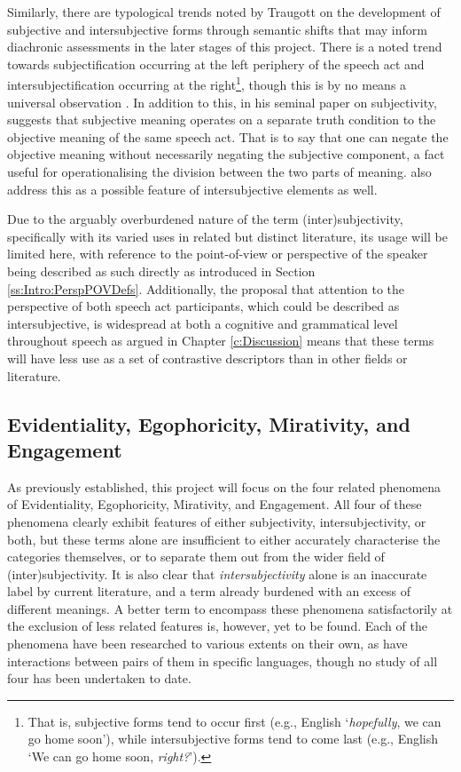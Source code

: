 Similarly, there are typological trends noted by Traugott on the development of subjective and intersubjective forms through semantic shifts that may inform diachronic assessments in the later stages of this project. There is a noted trend towards subjectification occurring at the left periphery of the speech act and intersubjectification occurring at the right\footnote{That is, subjective forms tend to occur first (e.g., English `\textit{hopefully}, we can go home soon'), while intersubjective forms tend to come last (e.g., English `We can go home soon, \textit{right?}').}, though this is by no means a universal observation \cite{Traugott2014}. In addition to this, in his seminal paper on subjectivity,  suggests that subjective meaning operates on a separate truth condition to the objective meaning of the same speech act. That is to say that one can negate the objective meaning without necessarily negating the subjective component, a fact useful for operationalising the division between the two parts of meaning.  also address this as a possible feature of intersubjective elements as well.

Due to the arguably overburdened nature of the term (inter)subjectivity, specifically with its varied uses in related but distinct literature, its usage will be limited here, with reference to the point-of-view or perspective of the speaker being described as such directly as introduced in Section \ref{ss:Intro:PerspPOVDefs}. Additionally, the proposal that attention to the perspective of both speech act participants, which could be described as intersubjective, is widespread at both a cognitive and grammatical level throughout speech as argued in Chapter \ref{c:Discussion} means that these terms will have less use as a set of contrastive descriptors than in other fields or literature.


\subsection{Evidentiality, Egophoricity, Mirativity, and Engagement}\label{ss:Intro:EpisLit}
As previously established, this project will focus on the four related phenomena of Evidentiality, Egophoricity, Mirativity, and Engagement. All four of these phenomena clearly exhibit features of either subjectivity, intersubjectivity, or both, but these terms alone are insufficient to either accurately characterise the categories themselves, or to separate them out from the wider field of (inter)subjectivity. It is also clear that \textit{intersubjectivity} alone is an inaccurate label by current literature, and a term already burdened with an excess of different meanings. A better term to encompass these phenomena satisfactorily at the exclusion of less related features is, however, yet to be found. Each of the phenomena have been researched to various extents on their own, as have interactions between pairs of them in specific languages, though no study of all four has been undertaken to date.


